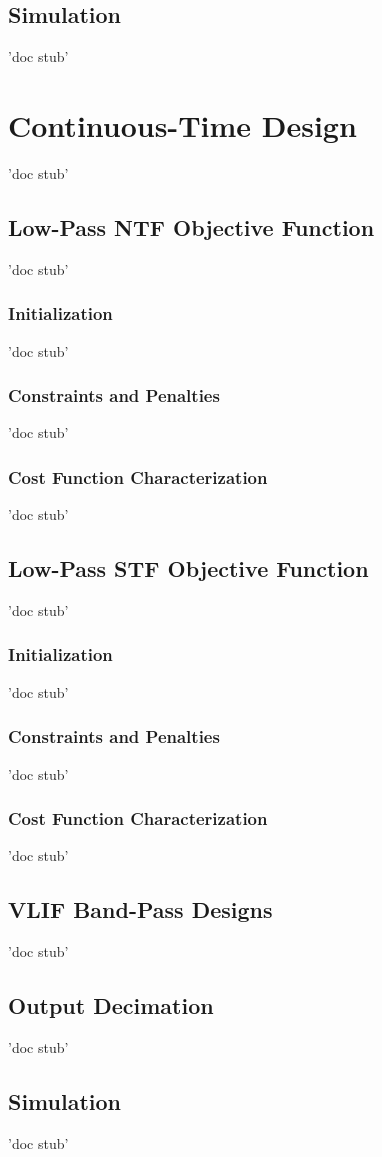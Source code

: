 \subsection{Simulation}
'doc stub'

\section{Continuous-Time \DSM Design}
'doc stub'

\subsection{Low-Pass NTF Objective Function}'doc stub'
\subsubsection{Initialization}'doc stub'
\subsubsection{Constraints and Penalties}'doc stub'
\subsubsection{Cost Function Characterization}'doc stub'

\subsection{Low-Pass STF Objective Function}'doc stub'
\subsubsection{Initialization}'doc stub'
\subsubsection{Constraints and Penalties}'doc stub'
\subsubsection{Cost Function Characterization}'doc stub'

\subsection{VLIF Band-Pass Designs}
'doc stub'

\subsection{Output Decimation}
'doc stub'

\subsection{Simulation}
'doc stub'
